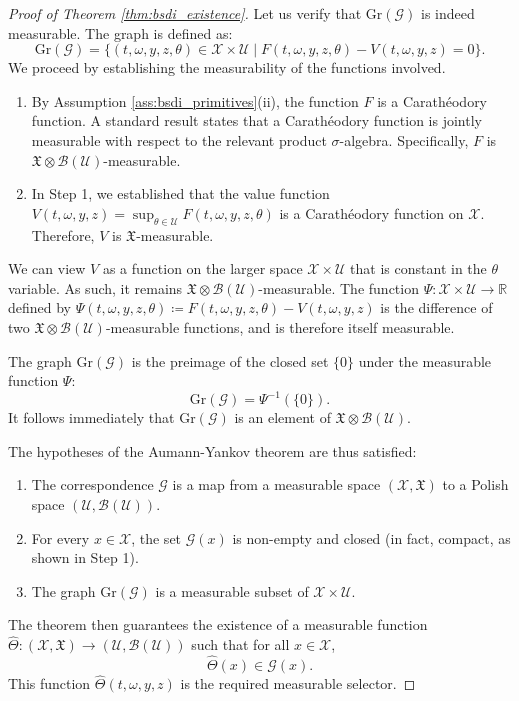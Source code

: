 \documentclass[12pt, letterpaper]{amsart}
\newcommand{\Ucal}{\mathcal{U}}
\newcommand{\R}{\mathbb{R}}
\theoremstyle{plain}
\theoremstyle{definition}
\theoremstyle{remark}
\numberwithin{equation}{section} %
\begin{document}
\begin{proof}[Proof of Theorem \ref{thm:bsdi_existence}]
Let us verify that $\mathrm{Gr}(\mathcal{G})$ is indeed measurable. The graph is defined as:
\[ \mathrm{Gr}(\mathcal{G}) = \{ (t, \omega, y, z, \theta) \in \mathcal{X} \times \Ucal \mid F(t,\omega,y,z,\theta) - V(t,\omega,y,z) = 0 \}. \]
We proceed by establishing the measurability of the functions involved.
\begin{enumerate}[label=(\roman*)]
    \item By Assumption \ref{ass:bsdi_primitives}(ii), the function $F$ is a Carathéodory function. A standard result states that a Carathéodory function is jointly measurable with respect to the relevant product $\sigma$-algebra. Specifically, $F$ is $\mathfrak{X} \otimes \mathcal{B}(\Ucal)$-measurable.

    \item In Step 1, we established that the value function $V(t,\omega,y,z) = \sup_{\theta \in \Ucal} F(t,\omega,y,z,\theta)$ is a Carathéodory function on $\mathcal{X}$. Therefore, $V$ is $\mathfrak{X}$-measurable.
\end{enumerate}
We can view $V$ as a function on the larger space $\mathcal{X} \times \Ucal$ that is constant in the $\theta$ variable. As such, it remains $\mathfrak{X} \otimes \mathcal{B}(\Ucal)$-measurable. The function $\Psi: \mathcal{X} \times \Ucal \to \R$ defined by $\Psi(t,\omega,y,z,\theta) \coloneqq F(t,\omega,y,z,\theta) - V(t,\omega,y,z)$ is the difference of two $\mathfrak{X} \otimes \mathcal{B}(\Ucal)$-measurable functions, and is therefore itself measurable.

The graph $\mathrm{Gr}(\mathcal{G})$ is the preimage of the closed set $\{0\}$ under the measurable function $\Psi$:
\[ \mathrm{Gr}(\mathcal{G}) = \Psi^{-1}(\{0\}). \]
It follows immediately that $\mathrm{Gr}(\mathcal{G})$ is an element of $\mathfrak{X} \otimes \mathcal{B}(\Ucal)$.

The hypotheses of the Aumann-Yankov theorem are thus satisfied:
\begin{enumerate}
    \item The correspondence $\mathcal{G}$ is a map from a measurable space $(\mathcal{X}, \mathfrak{X})$ to a Polish space $(\Ucal, \mathcal{B}(\Ucal))$.
    \item For every $x \in \mathcal{X}$, the set $\mathcal{G}(x)$ is non-empty and closed (in fact, compact, as shown in Step 1).
    \item The graph $\mathrm{Gr}(\mathcal{G})$ is a measurable subset of $\mathcal{X} \times \Ucal$.
\end{enumerate}
The theorem then guarantees the existence of a measurable function $\hat{\Theta}: (\mathcal{X}, \mathfrak{X}) \to (\Ucal, \mathcal{B}(\Ucal))$ such that for all $x \in \mathcal{X}$,
\[ \hat{\Theta}(x) \in \mathcal{G}(x). \]
This function $\hat{\Theta}(t,\omega,y,z)$ is the required measurable selector.


\end{proof}
\end{document}
